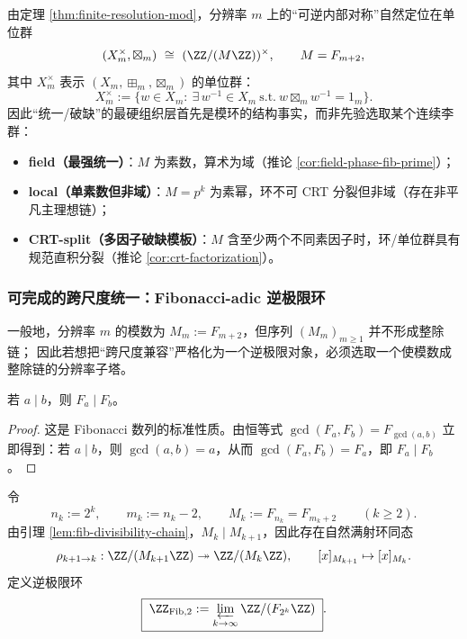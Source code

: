 \begin{remark}\label{rem:ring-phase-trichotomy}
由定理 \ref{thm:finite-resolution-mod}，分辨率 $m$ 上的“可逆内部对称”自然定位在单位群
\[
(X_m^\times,\boxtimes_m)\ \cong\ (\ZZ/(M\ZZ))^\times,\qquad M=F_{m+2},
\]
其中 $X_m^\times$ 表示 $(X_m,\boxplus_m,\boxtimes_m)$ 的单位群：
\[
X_m^\times:=\{w\in X_m:\ \exists\,w^{-1}\in X_m\ \text{s.t.}\ w\boxtimes_m w^{-1}=1_m\}.
\]
因此“统一/破缺”的最硬组织层首先是模环的结构事实，而非先验选取某个连续李群：
\begin{itemize}
  \item \textbf{field（最强统一）}：$M$ 为素数，算术为域（推论 \ref{cor:field-phase-fib-prime}）；
  \item \textbf{local（单素数但非域）}：$M=p^k$ 为素幂，环不可 CRT 分裂但非域（存在非平凡主理想链）；
  \item \textbf{CRT-split（多因子破缺模板）}：$M$ 含至少两个不同素因子时，环/单位群具有规范直积分裂（推论 \ref{cor:crt-factorization}）。
\end{itemize}
\end{remark}

\subsubsection{可完成的跨尺度统一：Fibonacci-adic 逆极限环}\label{subsubsec:fib-adic-inverse-limit}
一般地，分辨率 $m$ 的模数为 $M_m:=F_{m+2}$，但序列 $(M_m)_{m\ge 1}$ 并不形成整除链；
因此若想把“跨尺度兼容”严格化为一个逆极限对象，必须选取一个使模数成整除链的分辨率子塔。

\begin{lemma}\label{lem:fib-divisibility-chain}
若 $a\mid b$，则 $F_a\mid F_b$。
\end{lemma}
\begin{proof}
这是 Fibonacci 数列的标准性质。由恒等式
\(
\gcd(F_a,F_b)=F_{\gcd(a,b)}
\)
立即得到：若 $a\mid b$，则 $\gcd(a,b)=a$，从而 $\gcd(F_a,F_b)=F_a$，即 $F_a\mid F_b$。
\end{proof}

\begin{definition}\label{def:fib-adic-ring}
令
\[
n_k:=2^k,\qquad m_k:=n_k-2,\qquad M_k:=F_{n_k}=F_{m_k+2}\qquad(k\ge 2).
\]
由引理 \ref{lem:fib-divisibility-chain}，$M_k\mid M_{k+1}$，因此存在自然满射环同态
\[
\rho_{k+1\to k}:\ZZ/(M_{k+1}\ZZ)\twoheadrightarrow \ZZ/(M_k\ZZ),
\qquad [x]_{M_{k+1}}\mapsto [x]_{M_k}.
\]
定义逆极限环
\[
\boxed{\;
\ZZ_{\mathrm{Fib},2}:=\varprojlim_{k\to\infty}\ZZ/(F_{2^k}\ZZ)
\;}.
\]
\end{definition}

